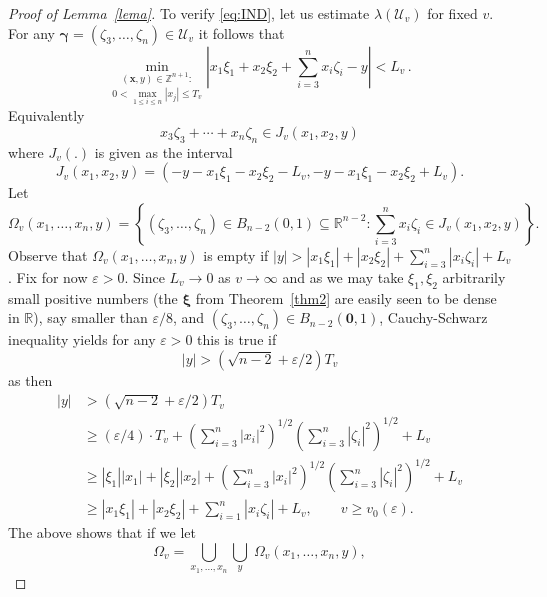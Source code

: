 \documentclass[10pt]{amsart}
\theoremstyle{definition}
\newcommand{\ux}{\boldsymbol{\xi}}
\newcommand{\R}{\mathbb{R}}
\newcommand{\Z}{\mathbb{Z}}
\newcommand{\ug}{\boldsymbol{\gamma}}
\begin{document}
\begin{proof}[Proof of Lemma~\ref{lema}]
To verify \eqref{eq:IND},
let us estimate $\lambda(\mathcal{U}_v)$ for fixed $v$. For any
 $\ug=(\zeta_3,\ldots,\zeta_n)\in \mathcal{U}_v$ it follows that 
\begin{equation*}
    \underset{0<\max_{1\leq i \leq n}|x_{j}|\leq T_{v}}{\min_{(\boldsymbol{x},y)\in\Z^{n+1}:}}
     \left| x_{1}\xi_{1}+x_{2}\xi_{2}+\sum_{i=3}^{n}x_{i}\zeta_{i} -y\right|< L_{v}\, .
\end{equation*}
Equivalently
\[
x_3 \zeta_3 + \cdots+ x_n \zeta_n \in J_{v}(x_1,x_2,y)
\]
where $J_{v}(.)$ is given as the interval
\[
J_v(x_1,x_2,y)= ( -y-x_1\xi_1-x_2\xi_2-L_v , -y-x_1\xi_1-x_2\xi_2+L_v  ).
\]
Let 
\[
\Omega_v(x_1,\ldots, x_n,y)=
\left\{ (\zeta_3,\ldots,\zeta_n)\in B_{n-2}(0,1)\subseteq \R^{n-2}: \sum_{i=3}^{n}x_{i}\zeta_{i} \in J_{v}(x_1,x_2,y) \right\}.
\]
Observe that $\Omega_v(x_1,\ldots,x_n,y)$ is empty if $|y|>|x_{1}\xi_{1}|+|x_{2}\xi_{2}|+\sum_{i=3}^{n} |x_i \zeta_i|+L_v$.
Fix for now $\varepsilon>0$.
Since $L_v\to 0$ as $v\to\infty$ and as we may take $\xi_1,\xi_2$
arbitrarily small positive numbers (the $\ux$ from Theorem~\ref{thm2} are easily seen to be dense in $\R$), say smaller than $\varepsilon/8$,
and $(\zeta_3,\ldots,\zeta_n)\in B_{n-2}(\boldsymbol{0},1)$, Cauchy-Schwarz inequality 
yields for any $\varepsilon>0$ this is true if
\[
|y|> (\sqrt{n-2}+\varepsilon/2) T_v
\]
as then
\begin{align*}
|y|&> (\sqrt{n-2}+\varepsilon/2) T_v \\
&\ge (\varepsilon/4)\cdot T_v+ \left(\sum_{i=3}^{n} |x_i|^2\right)^{1/2}\left(\sum_{i=3}^{n} |\zeta_i|^2\right)^{1/2}+L_v
\\ &\ge |\xi_1| |x_1| + |\xi_2| |x_2|+ \left(\sum_{i=3}^{n} |x_i|^2\right)^{1/2}\left(\sum_{i=3}^{n} |\zeta_i|^2\right)^{1/2}+L_v
\\
&\ge |x_{1}\xi_{1}|+|x_{2}\xi_{2}|+ \sum_{i=1}^{n} |x_i\zeta_i|+L_v, \qquad v\ge v_0(\varepsilon).
\end{align*}
The above shows that if we let
\begin{equation}  \label{eq:inu}
\Omega_v= \bigcup_{x_1,\ldots,x_n} \bigcup_{y}\; \Omega_v(x_1,\ldots,x_n,y),

\end{equation}
\end{proof}
\end{document}

